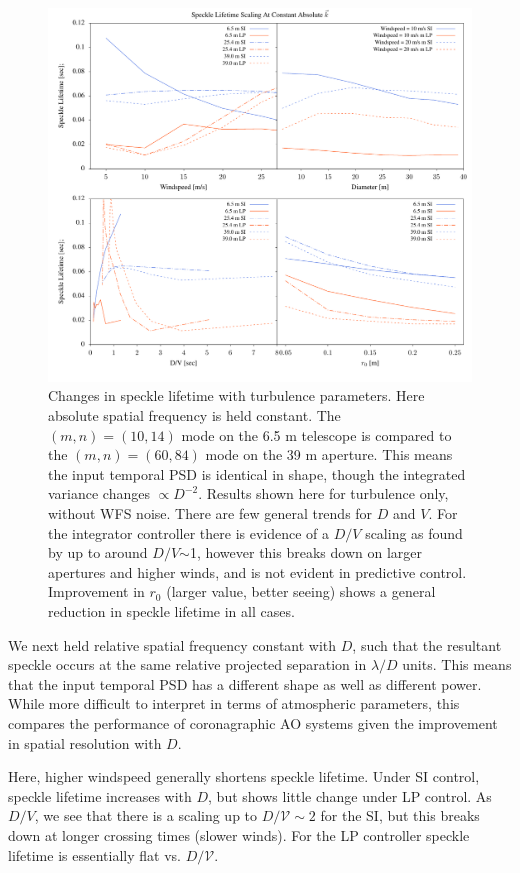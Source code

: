\documentclass[10pt,preprint]{aastex631}
\begin{document}
\begin{figure}
\includegraphics[width=5.5in]{scalings.pdf}
\caption{Changes in speckle lifetime with turbulence parameters.  Here absolute spatial frequency is held constant.  The $(m,n)=(10,14)$ mode on the 6.5 m telescope is compared to the $(m,n)=(60,84)$ mode on the 39 m aperture.  This means the input temporal PSD is identical in shape, though the integrated variance changes $\propto D^{-2}$.  Results shown here for turbulence only, without WFS noise. There are few general trends for $D$ and $V$. For the integrator controller there is evidence of a $D/V$ scaling as found by \citet{2005SPIE.5903..170M} up to around $D/V$$\sim$1, however this breaks down on larger apertures and higher winds, and is not evident in predictive control.  Improvement in $r_0$ (larger value, better seeing) shows a general reduction in speckle lifetime in all cases.
\label{fig:scalings}
}
\end{figure}

We next held relative spatial frequency constant with $D$, such that the resultant speckle occurs at the same relative projected separation in $\lambda/D$ units.  This means that the input temporal PSD has a different shape as well as different power.  While more difficult to interpret in terms of atmospheric parameters, this compares the performance of coronagraphic AO systems given the improvement in spatial resolution with $D$.

Here, higher windspeed generally shortens speckle lifetime.  Under SI control, speckle lifetime increases with $D$, but shows little change under LP control.  As $D/V$, we see that there is a scaling up to $D/\mathcal{V} \sim 2$ for the SI, but this breaks down at longer crossing times (slower winds). For the LP controller speckle lifetime is essentially flat vs. $D/\mathcal{V}$.
\end{document}
